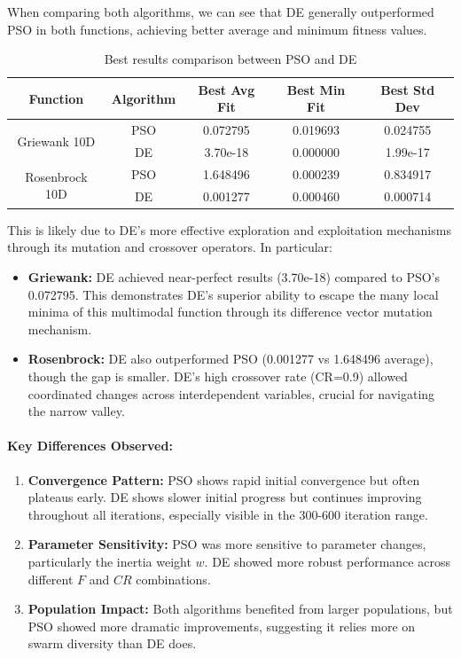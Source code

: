 \documentclass[12pt,a4paper]{article}
\begin{document}
When comparing both algorithms, we can see that DE generally outperformed PSO in 
both functions, achieving better average and minimum fitness values.

\begin{table}[H]
\centering
\begin{tabular}{c c c c c}
\hline
\textbf{Function} & \textbf{Algorithm} & \textbf{Best Avg Fit} & \textbf{Best Min Fit} & \textbf{Best Std Dev} \\
\hline
\multirow{2}{*}{Griewank 10D} 
& PSO & 0.072795 & 0.019693 & 0.024755 \\
& DE & 3.70e-18 & 0.000000 & 1.99e-17 \\
\hline
\multirow{2}{*}{Rosenbrock 10D} 
& PSO & 1.648496 & 0.000239 & 0.834917 \\
& DE & 0.001277 & 0.000460 & 0.000714 \\
\hline
\end{tabular}
\caption{Best results comparison between PSO and DE}
\end{table}

This is likely due to DE's more effective exploration and exploitation mechanisms 
through its mutation and crossover operators. In particular:

\begin{itemize}
\item \textbf{Griewank:} DE achieved near-perfect results (3.70e-18) compared to PSO's 
0.072795. This demonstrates DE's superior ability to escape the many local minima 
of this multimodal function through its difference vector mutation mechanism.

\item \textbf{Rosenbrock:} DE also outperformed PSO (0.001277 vs 1.648496 average), 
though the gap is smaller. DE's high crossover rate (CR=0.9) allowed coordinated 
changes across interdependent variables, crucial for navigating the narrow valley.
\end{itemize}

\paragraph{Key Differences Observed:}
\begin{enumerate}
\item \textbf{Convergence Pattern:} PSO shows rapid initial convergence but often 
plateaus early. DE shows slower initial progress but continues improving throughout 
all iterations, especially visible in the 300-600 iteration range.

\item \textbf{Parameter Sensitivity:} PSO was more sensitive to parameter changes, 
particularly the inertia weight $w$. DE showed more robust performance across 
different $F$ and $CR$ combinations.

\item \textbf{Population Impact:} Both algorithms benefited from larger populations, 
but PSO showed more dramatic improvements, suggesting it relies more on swarm 
diversity than DE does.
\end{enumerate}
\end{document}
